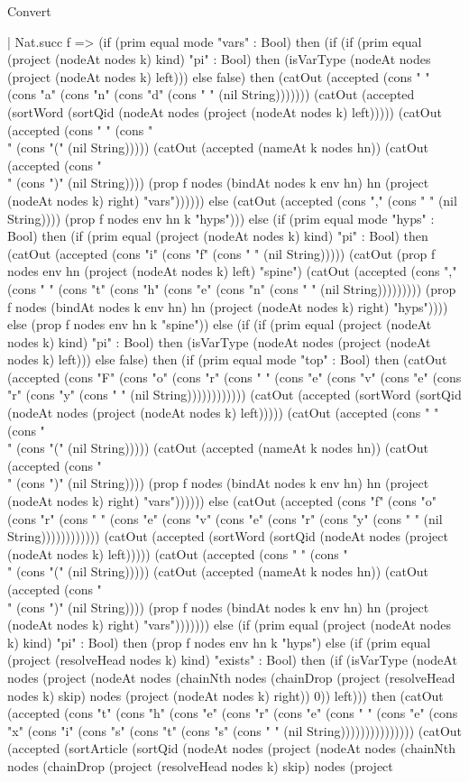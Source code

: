\begin{lexlean}{Convert}
\begin{semanticmodule}
{    | Nat.succ f => (if (prim equal mode "vars" : Bool) then (if (if (prim equal (project (nodeAt nodes k) kind) "pi" : Bool) then (isVarType (nodeAt nodes (project (nodeAt nodes k) left))) else false) then (catOut (accepted (cons " " (cons "a" (cons "n" (cons "d" (cons " " (nil String))))))) (catOut (accepted (sortWord (sortQid (nodeAt nodes (project (nodeAt nodes k) left))))) (catOut (accepted (cons " " (cons "\\" (cons "(" (nil String))))) (catOut (accepted (nameAt k nodes hn)) (catOut (accepted (cons "\\" (cons ")" (nil String)))) (prop f nodes (bindAt nodes k env hn) hn (project (nodeAt nodes k) right) "vars")))))) else (catOut (accepted (cons "," (cons " " (nil String)))) (prop f nodes env hn k "hyps"))) else (if (prim equal mode "hyps" : Bool) then (if (prim equal (project (nodeAt nodes k) kind) "pi" : Bool) then (catOut (accepted (cons "i" (cons "f" (cons " " (nil String))))) (catOut (prop f nodes env hn (project (nodeAt nodes k) left) "spine") (catOut (accepted (cons "," (cons " " (cons "t" (cons "h" (cons "e" (cons "n" (cons " " (nil String))))))))) (prop f nodes (bindAt nodes k env hn) hn (project (nodeAt nodes k) right) "hyps")))) else (prop f nodes env hn k "spine")) else (if (if (prim equal (project (nodeAt nodes k) kind) "pi" : Bool) then (isVarType (nodeAt nodes (project (nodeAt nodes k) left))) else false) then (if (prim equal mode "top" : Bool) then (catOut (accepted (cons "F" (cons "o" (cons "r" (cons " " (cons "e" (cons "v" (cons "e" (cons "r" (cons "y" (cons " " (nil String)))))))))))) (catOut (accepted (sortWord (sortQid (nodeAt nodes (project (nodeAt nodes k) left))))) (catOut (accepted (cons " " (cons "\\" (cons "(" (nil String))))) (catOut (accepted (nameAt k nodes hn)) (catOut (accepted (cons "\\" (cons ")" (nil String)))) (prop f nodes (bindAt nodes k env hn) hn (project (nodeAt nodes k) right) "vars")))))) else (catOut (accepted (cons "f" (cons "o" (cons "r" (cons " " (cons "e" (cons "v" (cons "e" (cons "r" (cons "y" (cons " " (nil String)))))))))))) (catOut (accepted (sortWord (sortQid (nodeAt nodes (project (nodeAt nodes k) left))))) (catOut (accepted (cons " " (cons "\\" (cons "(" (nil String))))) (catOut (accepted (nameAt k nodes hn)) (catOut (accepted (cons "\\" (cons ")" (nil String)))) (prop f nodes (bindAt nodes k env hn) hn (project (nodeAt nodes k) right) "vars"))))))) else (if (prim equal (project (nodeAt nodes k) kind) "pi" : Bool) then (prop f nodes env hn k "hyps") else (if (prim equal (project (resolveHead nodes k) kind) "exists" : Bool) then (if (isVarType (nodeAt nodes (project (nodeAt nodes (chainNth nodes (chainDrop (project (resolveHead nodes k) skip) nodes (project (nodeAt nodes k) right)) 0)) left))) then (catOut (accepted (cons "t" (cons "h" (cons "e" (cons "r" (cons "e" (cons " " (cons "e" (cons "x" (cons "i" (cons "s" (cons "t" (cons "s" (cons " " (nil String))))))))))))))) (catOut (accepted (sortArticle (sortQid (nodeAt nodes (project (nodeAt nodes (chainNth nodes (chainDrop (project (resolveHead nodes k) skip) nodes (project }
\end{semanticmodule}
\end{lexlean}
